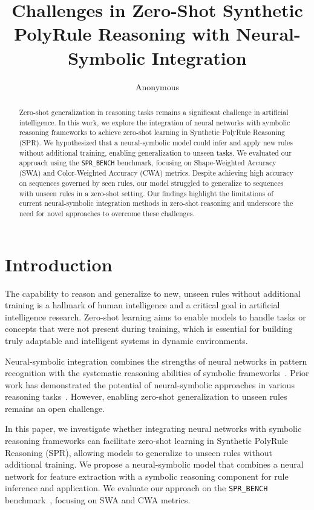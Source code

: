 \documentclass{article} %
\title{Challenges in Zero-Shot Synthetic PolyRule Reasoning with Neural-Symbolic Integration}
\author{Anonymous}
\theoremstyle{plain}
\begin{document}
\maketitle

\begin{abstract}
Zero-shot generalization in reasoning tasks remains a significant challenge in artificial intelligence. In this work, we explore the integration of neural networks with symbolic reasoning frameworks to achieve zero-shot learning in Synthetic PolyRule Reasoning (SPR). We hypothesized that a neural-symbolic model could infer and apply new rules without additional training, enabling generalization to unseen tasks. We evaluated our approach using the \texttt{SPR\_BENCH} benchmark, focusing on Shape-Weighted Accuracy (SWA) and Color-Weighted Accuracy (CWA) metrics. Despite achieving high accuracy on sequences governed by seen rules, our model struggled to generalize to sequences with unseen rules in a zero-shot setting. Our findings highlight the limitations of current neural-symbolic integration methods in zero-shot reasoning and underscore the need for novel approaches to overcome these challenges.
\end{abstract}

\section{Introduction}
\label{sec:intro}

The capability to reason and generalize to new, unseen rules without additional training is a hallmark of human intelligence and a critical goal in artificial intelligence research. Zero-shot learning aims to enable models to handle tasks or concepts that were not present during training, which is essential for building truly adaptable and intelligent systems in dynamic environments.

Neural-symbolic integration combines the strengths of neural networks in pattern recognition with the systematic reasoning abilities of symbolic frameworks~\citep{hitzler2020neuralsymbolicia}. Prior work has demonstrated the potential of neural-symbolic approaches in various reasoning tasks~\citep{ma2020knowledgedrivendc, burghouts2024openworldvr}. However, enabling zero-shot generalization to unseen rules remains an open challenge.

In this paper, we investigate whether integrating neural networks with symbolic reasoning frameworks can facilitate zero-shot learning in Synthetic PolyRule Reasoning (SPR), allowing models to generalize to unseen rules without additional training. We propose a neural-symbolic model that combines a neural network for feature extraction with a symbolic reasoning component for rule inference and application. We evaluate our approach on the \texttt{SPR\_BENCH} benchmark~\citep{bortolotti2024anb}, focusing on SWA and CWA metrics.
\end{document}
